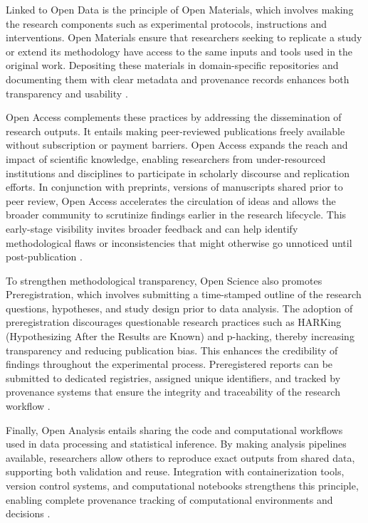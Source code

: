 \documentclass[final]{rc-book-2.14}
\begin{document}
Linked to Open Data is the principle of Open Materials, which involves making the research components such as experimental protocols, instructions and interventions. Open Materials ensure that researchers seeking to replicate a study or extend its methodology have access to the same inputs and tools used in the original work. Depositing these materials in domain-specific repositories and documenting them with clear metadata and provenance records enhances both transparency and usability \cite{van_dijk_open_2021}.

Open Access complements these practices by addressing the dissemination of research outputs. It entails making peer-reviewed publications freely available without subscription or payment barriers. Open Access expands the reach and impact of scientific knowledge, enabling researchers from under-resourced institutions and disciplines to participate in scholarly discourse and replication efforts. In conjunction with preprints, versions of manuscripts shared prior to peer review, Open Access accelerates the circulation of ideas and allows the broader community to scrutinize findings earlier in the research lifecycle. This early-stage visibility invites broader feedback and can help identify methodological flaws or inconsistencies that might otherwise go unnoticed until post-publication \cite{van_dijk_open_2021}.

To strengthen methodological transparency, Open Science also promotes Preregistration, which involves submitting a time-stamped outline of the research questions, hypotheses, and study design prior to data analysis. The adoption of preregistration discourages questionable research practices such as HARKing (Hypothesizing After the Results are Known) and p-hacking, thereby increasing transparency and reducing publication bias. This enhances the credibility of findings throughout the experimental process. Preregistered reports can be submitted to dedicated registries, assigned unique identifiers, and tracked by provenance systems that ensure the integrity and traceability of the research workflow \cite{van_dijk_open_2021}.

Finally, Open Analysis entails sharing the code and computational workflows used in data processing and statistical inference. By making analysis pipelines available, researchers allow others to reproduce exact outputs from shared data, supporting both validation and reuse. Integration with containerization tools, version control systems, and computational notebooks strengthens this principle, enabling complete provenance tracking of computational environments and decisions \cite{van_dijk_open_2021}.
\end{document}
